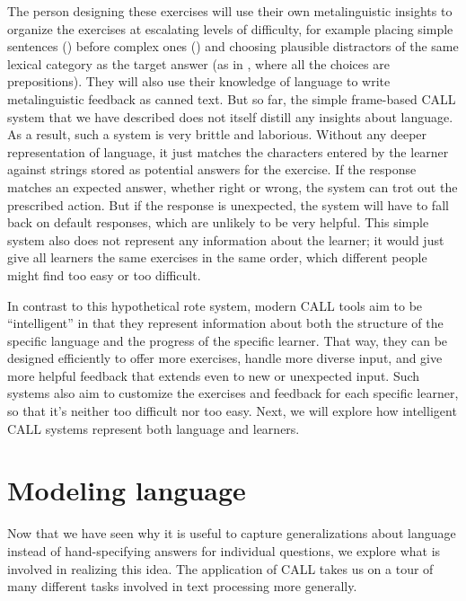 The person designing these exercises will use their own metalinguistic insights to organize the exercises at escalating levels of difficulty, for example placing simple sentences () before complex ones () and choosing plausible distractors of the same lexical category as the target answer (as in , where all the choices are prepositions).  They will also use their knowledge of language to write metalinguistic feedback as canned text.  But so far, the simple frame-based CALL system that we have described does not itself distill any insights about language.  As a result, such a system is very brittle and laborious.  Without any deeper representation of language, it just matches
the characters entered by the learner against strings stored as potential answers for the exercise.  If the response matches an expected answer, whether right or wrong, the system can trot out the prescribed action. But if the response is unexpected, the system will have to fall back on default responses, which are unlikely to be very helpful.  This simple system also does not represent any information about the learner; it would just give all learners the same exercises in the same order, which different people might find too easy or too difficult.

In contrast to this hypothetical rote system, modern CALL tools aim to be ``intelligent'' in that they represent information about both the structure of the specific language and the progress of the specific learner.  That way, they can be designed efficiently to offer more exercises, handle more diverse input, and give more helpful feedback that extends even to new or unexpected input.  Such systems also aim to customize the exercises and feedback for each specific learner, so that it's neither too difficult nor too easy.  Next, we will explore how intelligent CALL systems represent both language and learners.







\section{Modeling language}

Now that we have seen why it is useful to capture generalizations about language instead of hand-specifying answers for individual questions, we explore what is involved in realizing this idea.  The application of CALL takes us on a tour of many different tasks involved in text processing more generally. 

